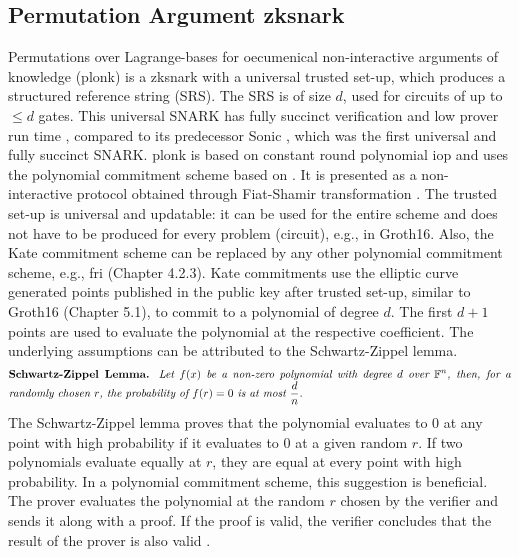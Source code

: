 \subsection{Permutation Argument \acrshort{zksnark}}
Permutations over Lagrange-bases for oecumenical non-interactive arguments of knowledge (\acrshort{plonk}) is a \acrshort{zksnark} with a universal trusted set-up, which produces a structured reference string (SRS). The SRS is of size \(d\), used for circuits of up to \(\leq d\) gates. This universal SNARK has fully succinct verification and low prover run time \citep{PLONKcryptoeprint:2019/953}, compared to its predecessor Sonic \citep{SONIC10.1145/3319535.3339817}, which was the first universal and fully succinct SNARK. \acrshort{plonk} is based on constant round polynomial \acrshort{iop} and uses the polynomial commitment scheme based on \citet{Kate2010ConstantSizeCT}. It is presented as a non-interactive protocol obtained through Fiat-Shamir transformation \citep{PLONKcryptoeprint:2019/953}. The trusted set-up is universal and updatable: it can be used for the entire scheme and does not have to be produced for every problem (circuit), e.g., in Groth16. Also, the Kate commitment scheme can be replaced by any other polynomial commitment scheme, e.g., \acrshort{fri} (Chapter 4.2.3). 
Kate commitments use the elliptic curve generated points published in the public key after trusted set-up, similar to Groth16 (Chapter 5.1), to commit to a polynomial of degree \(d\). The first \(d+1\) points are used to evaluate the polynomial at the respective coefficient. The underlying assumptions can be attributed to the Schwartz-Zippel lemma.
\begin{align*}
    \text{\parbox{450pt}{\textbf{Schwartz-Zippel Lemma.} \textit{Let \(f(x)\) be a non-zero polynomial with degree \(d\) over \begin{math}\mathbb{F}^n\end{math}, then, for a randomly chosen \(r\), the probability of \(f(r) = 0\) is at most \(\frac{d}{n}\).}}}
\end{align*}
The Schwartz-Zippel lemma proves that the polynomial evaluates to 0 at any point with high probability if it evaluates to 0 at a given random \(r\). If two polynomials evaluate equally at \(r\), they are equal at every point with high probability. In a polynomial commitment scheme, this suggestion is beneficial. The prover evaluates the polynomial at the random \(r\) chosen by the verifier and sends it along with a proof. If the proof is valid, the verifier concludes that the result of the prover is also valid \citep{Kate2010ConstantSizeCT}.

